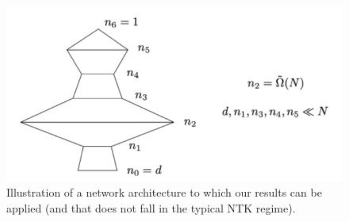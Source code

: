 \documentclass[11pt]{article}
\begin{document}
\begin{figure}[t]
    \centering
    \includegraphics[width=.5\columnwidth]{net_pic}
\caption{Illustration of a network architecture to which our results can be applied (and that does not fall in the typical NTK regime).}\label{fig:net}
\end{figure}

% 
\end{document}
